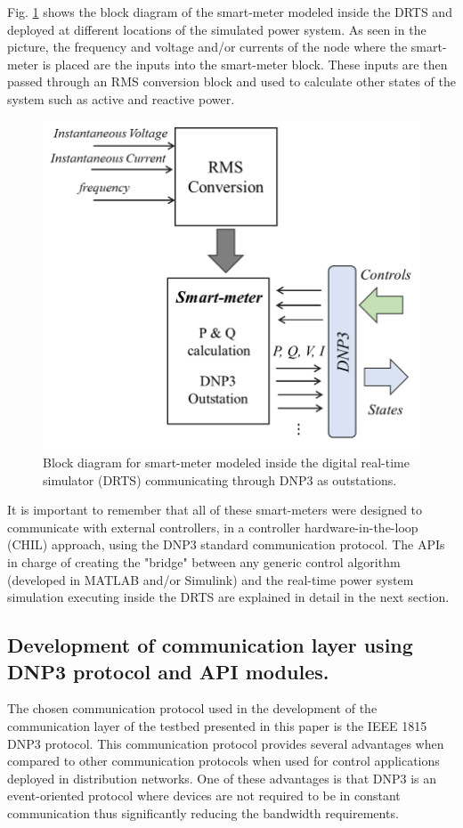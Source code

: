 Fig. \ref{fig:sm_meter} shows the block diagram of the smart-meter modeled inside the DRTS and deployed at different locations of the simulated power system. As seen in the picture, the frequency and voltage and/or currents of the node where the smart-meter is placed are the inputs into the smart-meter block. These inputs are then passed through an RMS conversion block and used to calculate other states of the system such as active and reactive power.

\begin{figure}[!ht]
    \centering
    \includegraphics[width = 0.8\linewidth]{figs_juan/sm_meter.png}
    \caption{Block diagram for smart-meter modeled inside the digital real-time simulator (DRTS) communicating through DNP3 as outstations.}
    \label{fig:sm_meter}
\end{figure}



It is important to remember that all of these smart-meters were designed to communicate with external controllers, in a controller hardware-in-the-loop (CHIL) approach, using the DNP3 standard communication protocol. The APIs in charge of creating the "bridge" between any generic control algorithm (developed in MATLAB and/or Simulink) and the real-time power system simulation executing inside the DRTS are explained in detail in the next section. 


\subsection{Development of communication layer using DNP3 protocol and API modules.}
The chosen communication protocol used in the development of the communication layer of the testbed presented in this paper is the IEEE 1815 DNP3 protocol. This communication protocol provides several advantages when compared to other communication protocols when used for control applications deployed in distribution networks. One of these advantages is that DNP3 is an event-oriented protocol where devices are not required to be in constant communication thus significantly reducing the bandwidth requirements.

